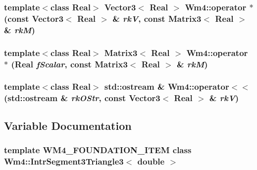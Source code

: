 \subsubsection{\setlength{\rightskip}{0pt plus 5cm}template$<$class Real$>$ {\bf Vector3}$<$ Real $>$ Wm4::operator $\ast$ (const Vector3$<$ Real $>$ \& {\em rk\-V}, const Matrix3$<$ Real $>$ \& {\em rk\-M})\hspace{0.3cm}{\tt  [inline]}}\label{namespaceWm4_2f836125d7cd277938903bfef23cdad1}


\subsubsection{\setlength{\rightskip}{0pt plus 5cm}template$<$class Real$>$ {\bf Matrix3}$<$ Real $>$ Wm4::operator $\ast$ (Real {\em f\-Scalar}, const Matrix3$<$ Real $>$ \& {\em rk\-M})\hspace{0.3cm}{\tt  [inline]}}\label{namespaceWm4_44b8a95f5c53512a77d4f0a6eb3128b9}


\subsubsection{\setlength{\rightskip}{0pt plus 5cm}template$<$class Real$>$ std::ostream \& Wm4::operator$<$$<$ (std::ostream \& {\em rk\-OStr}, const Vector3$<$ Real $>$ \& {\em rk\-V})}\label{namespaceWm4_49191c9a535c51c4ed16e47987779d06}




\subsection{Variable Documentation}
\subsubsection{\setlength{\rightskip}{0pt plus 5cm}template WM4\_\-FOUNDATION\_\-ITEM class {\bf Wm4::Intr\-Segment3Triangle3}$<$ double $>$}\label{namespaceWm4_cf6638f107707b030ecbe71126ad2739}



